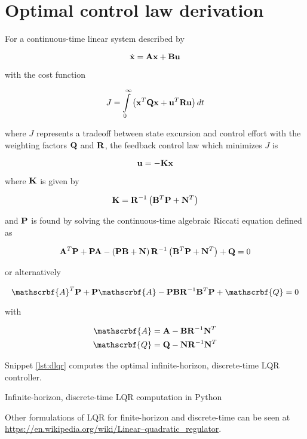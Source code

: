 \chapter{Optimal control law derivation}
\label{ch:app-optimal-control-law-deriv}

For a continuous-time linear system described by

\begin{equation}
  \dot{\mathbf{x}} = \mathbf{A}\mathbf{x} + \mathbf{B}\mathbf{u}
\end{equation}

\noindent with the cost function

\begin{equation*}
  J = \int\limits_0^\infty \left(\mathbf{x}^T\mathbf{Q}\mathbf{x} +
    \mathbf{u}^T\mathbf{R}\mathbf{u}\right) dt
\end{equation*}

\noindent where $J$ represents a tradeoff between \gls{state} excursion and
control effort with the weighting factors $\mathbf{Q}$ and $\mathbf{R}$, the feedback
\gls{control law} which minimizes $J$ is

\begin{equation*}
  \mathbf{u} = -\mathbf{K}\mathbf{x}
\end{equation*}

\noindent where $\mathbf{K}$ is given by

\begin{equation*}
  \mathbf{K} = \mathbf{R}^{-1} \left(\mathbf{B}^T\mathbf{P} + \mathbf{N}^T\right)
\end{equation*}

\noindent and $\mathbf{P}$ is found by solving the continuous-time algebraic
Riccati equation defined as

\begin{equation*}
  \mathbf{A}^T\mathbf{P} + \mathbf{P}\mathbf{A} - \left(\mathbf{P}\mathbf{B} +
    \mathbf{N}\right) \mathbf{R}^{-1} \left(\mathbf{B}^T\mathbf{P} + \mathbf{N}^T\right) +
    \mathbf{Q} = 0
\end{equation*}

\noindent or alternatively

\begin{equation*}
  \mathscrbf{A}^T\mtx{P} + \mtx{P}\mathscrbf{A} -
    \mtx{P}\mtx{B}\mtx{R}^{-1}\mtx{B}^T\mtx{P} + \mathscrbf{Q} = 0
\end{equation*}

\noindent with

\begin{align*}
  \mathscrbf{A} &= \mtx{A} - \mtx{B}\mtx{R}^{-1}\mtx{N}^T \\
  \mathscrbf{Q} &= \mtx{Q} - \mtx{N}\mtx{R}^{-1}\mtx{N}^T
\end{align*}

Snippet \ref{lst:dlqr} computes the optimal infinite-horizon, discrete-time
LQR controller.

\begin{snippet}
  \caption{Infinite-horizon, discrete-time LQR computation in Python}
  \label{lst:dlqr}
\end{snippet}

Other formulations of LQR for finite-horizon and discrete-time can be seen at
\url{https://en.wikipedia.org/wiki/Linear–quadratic_regulator}.
